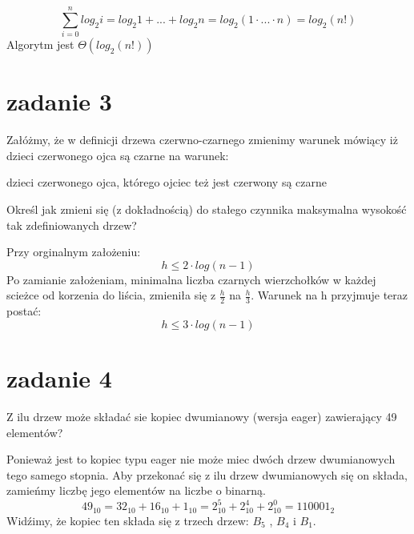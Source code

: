 \documentclass[svgnames]{report}
\begin{document}
\begin{equation*}
	\sum\limits_{i=0}^{n} log_2 i = log_2 1 + ... + log_2 n = log_2(1 \cdot ... \cdot n) = log_2(n!)
\end{equation*}
Algorytm jest $\Theta(log_2(n!))$


\section{zadanie 3}
\begin{framed}
Załóżmy, że w definicji drzewa czerwno-czarnego zmienimy warunek mówiący iż dzieci czerwonego ojca są czarne na warunek:

dzieci czerwonego ojca, którego ojciec też jest czerwony są czarne

Określ jak zmieni się (z dokładnością) do stałego czynnika maksymalna wysokość tak zdefiniowanych drzew?

\end{framed}

Przy orginalnym założeniu:
\begin{equation*}
h \leqslant 2 \cdot log(n-1)
\end{equation*}
Po zamianie założeniam, minimalna liczba czarnych wierzchołków w każdej scieżce od korzenia do liścia, zmieniła się z $\frac{h}{2}$ na $\frac{h}{3}$. Warunek na h przyjmuje teraz postać:
\begin{equation*}
h \leqslant 3 \cdot log(n-1)
\end{equation*}


\section{zadanie 4}
\begin{framed}
Z ilu drzew może składać sie kopiec dwumianowy (wersja eager) zawierający 49 elementów?
\end{framed}
Ponieważ jest to kopiec typu eager nie może miec dwóch drzew dwumianowych tego samego stopnia.
Aby przekonać się z ilu drzew dwumianowych się on składa, zamieńmy liczbę jego elementów na liczbe o binarną.
\begin{equation}
49_{10} = 32_{10} + 16_{10} + 1_{10} = 2_{10}^5 + 2_{10}^4 + 2_{10}^0 = 110001_2
\end{equation} 
Widźimy, że kopiec ten składa się z trzech drzew: $B_5$ , $B_4$ i $B_1$.
\end{document}
